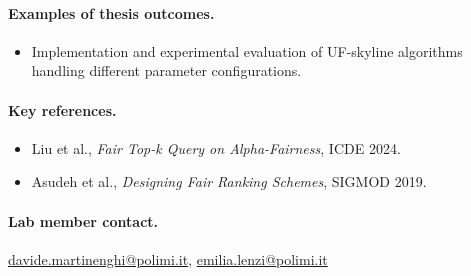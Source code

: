 \documentclass[a4paper,11pt]{article}
\begin{document}
\paragraph{Examples of thesis outcomes.}
\begin{itemize}[nosep]
  \item Implementation and experimental evaluation of UF-skyline algorithms handling different parameter configurations.
\end{itemize}

\paragraph{Key references.}
\begin{itemize}[nosep]
  \item Liu et al., \emph{Fair Top-k Query on Alpha-Fairness}, ICDE 2024.
  \item Asudeh et al., \emph{Designing Fair Ranking Schemes}, SIGMOD 2019.
\end{itemize}

\paragraph{Lab member contact.}
\url{davide.martinenghi@polimi.it}, \url{emilia.lenzi@polimi.it}
\end{document}
